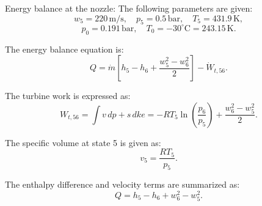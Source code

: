 Energy balance at the nozzle:  
The following parameters are given:  
\[
w_5 = 220 \, \text{m/s}, \quad p_5 = 0.5 \, \text{bar}, \quad T_5 = 431.9 \, \text{K},  
\]
\[
p_0 = 0.191 \, \text{bar}, \quad T_0 = -30^\circ\text{C} = 243.15 \, \text{K}.
\]

The energy balance equation is:  
\[
Q = \dot{m} \left[ h_5 - h_6 + \frac{w_5^2 - w_6^2}{2} \right] - \dot{W}_{t,56}.
\]

The turbine work is expressed as:  
\[
W_{t,56} = \int v \, dp + s \, dke = -RT_5 \ln \left( \frac{p_6}{p_5} \right) + \frac{w_6^2 - w_5^2}{2}.
\]

The specific volume at state 5 is given as:  
\[
v_5 = \frac{RT_5}{p_5}.
\]

The enthalpy difference and velocity terms are summarized as:  
\[
Q = h_5 - h_6 + w_6^2 - w_5^2.
\]